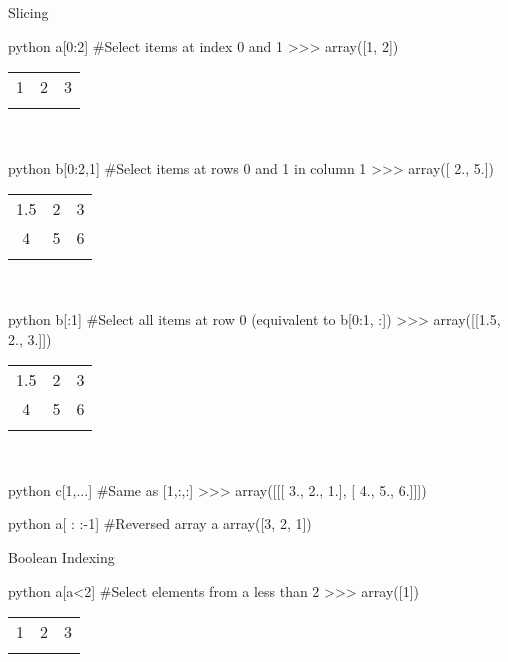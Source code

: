 \begin{myblock}{Slicing}
\begin{codebox}{python}{}
a[0:2]  #Select items at index 0 and 1
>>> array([1, 2])
\end{codebox}
\begin{tabular}{ |c|c|c| } 
 \hhline{---}
 \cellcolor[HTML]{FFFFFF}1 & \cellcolor[HTML]{FFFFFF}2 & 3\\
 \hhline{---}
\end{tabular}\\

\begin{codebox}{python}{}
b[0:2,1]  #Select items at rows 0 and 1 in column 1
>>> array([ 2., 5.])
\end{codebox}
\begin{tabular}{ |c|c|c| } 
 \hhline{---}
 1.5 & \cellcolor[HTML]{FFFFFF}2 & 3\\
 \hhline{---}
   4 & \cellcolor[HTML]{FFFFFF}5 & 6\\
 \hhline{---}
\end{tabular}\\

\begin{codebox}{python}{}
b[:1]  #Select all items at row 0 (equivalent to b[0:1, :])
>>> array([[1.5, 2., 3.]])
\end{codebox}
\begin{tabular}{ |c|c|c| } 
 \hhline{---}
 \cellcolor[HTML]{FFFFFF}1.5 & \cellcolor[HTML]{FFFFFF}2 & \cellcolor[HTML]{FFFFFF}3\\
 \hhline{---}
   4 & 5 & 6\\
 \hhline{---}
\end{tabular}\\

\begin{codebox}{python}{}
c[1,...]  #Same as [1,:,:]
>>> array([[[ 3., 2., 1.],
            [ 4., 5., 6.]]])
\end{codebox}

\begin{codebox}{python}{}
a[ : :-1]  #Reversed array a array([3, 2, 1])
\end{codebox}
\end{myblock}

\begin{myblock}{Boolean Indexing}
\begin{codebox}{python}{}
a[a<2]  #Select elements from a less than 2
>>> array([1])
\end{codebox}
\begin{tabular}{ |c|c|c| } 
 \hhline{---}
 \cellcolor[HTML]{FFFFFF}1 & 2 & 3\\
 \hhline{---}
\end{tabular}
\end{myblock}

